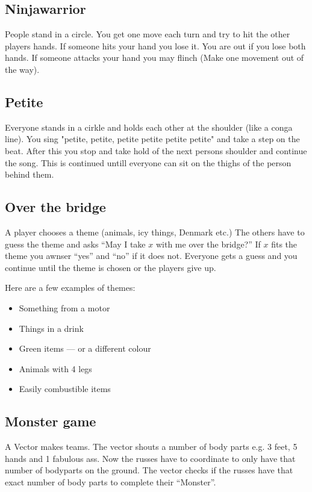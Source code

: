 \documentclass[../../../main.tex]{subfiles}
\begin{document}
\begin{multicols}{2}
\subsection*{Ninjawarrior}
    People stand in a circle. You get one move each turn and try to hit the other players hands. If someone hits your hand you lose it. You are out if you lose both hands. If someone attacks your hand you may flinch (Make one movement out of the way).

\subsection*{Petite}
    Everyone stands in a cirkle and holds each other at the shoulder (like a conga line). You sing "petite, petite, petite petite petite petite" and take a step on the beat. After this you stop and take hold of the next persons shoulder and continue the song. This is continued untill everyone can sit on the thighs of the person behind them.

\subsection*{Over the bridge}
    A player chooses a theme (animals, icy things, Denmark etc.) The others have to guess the theme and asks ``May I take $x$ with me over the bridge?'' If $x$ fits the theme you awnser ``yes'' and ``no'' if it does not. Everyone gets a guess and you continue until the theme is chosen or the players give up.
    
    Here are a few examples of themes:
    
    \begin{itemize}
        \item Something from a motor
        \item Things in a drink
        \item Green items --- or a different colour
        \item Animals with 4 legs
        \item Easily combustible items
    \end{itemize}

\subsection*{Monster game}
    A Vector makes teams. The vector shouts a number of body parts e.g. 3 feet, 5 hands and 1 fabulous ass.
    Now the russes have to coordinate to only have that number of bodyparts on the ground.
    The vector checks if the russes have that exact number of body parts to complete their ``Monster''.



\end{multicols}
\end{document}
